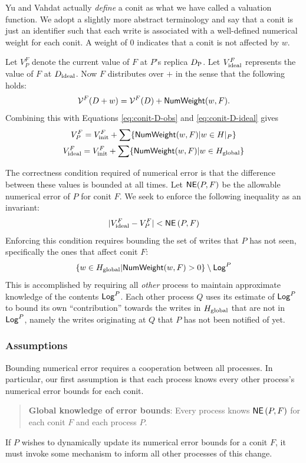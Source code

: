 \documentclass[]             %
{NASA}                       %
\theoremstyle{definition}
\begin{document}
Yu and Vahdat actually \emph{define} a conit as what we have called a
valuation function. We adopt a slightly more abstract terminology and
say that a conit is just an identifier such that each write is
associated with a well-defined numerical weight for each conit. A
weight of $0$ indicates that a conit is not affected by $w$.

Let $V^F_P$ denote the current value of $F$ at $P$'s replica $D_{\textrm{P}}$. Let
$V^{F}_{\textrm{ideal}}$ represents the value of $F$ at $D_{\textrm{ideal}}$.  Now $F$
distributes over $+$ in the sense that the following holds:
\begin{equation}
  \mathcal{V}^F(D + w) = \mathcal{V}^F(D) + \mathsf{NumWeight}(w, F).
\end{equation}
Combining this with Equations \eqref{eq:conit-D-obs} and
\eqref{eq:conit-D-ideal} gives
\begin{gather}
  V^{F}_{P} = V^{F}_{\textrm{init}} + \sum \{\mathsf{NumWeight}(w, F) | w \in H|_{P}\} \\
  V^{F}_{\textrm{ideal}} = V^{F}_{\textrm{init}} + \sum \{\mathsf{NumWeight}(w, F) | w \in H_\mathrm{global}\}
\end{gather}

The correctness condition required of numerical error is that the
difference between these values is bounded at all times. Let
$\mathsf{NE}(P, F)$ be the allowable numerical error of $P$ for conit $F$. We
seek to enforce the following inequality as an invariant:
\begin{equation}
  | V^{F}_{\textrm{ideal}} - V^{F}_{P} | < \mathsf{NE}\left(P, F \right)
\end{equation}
Enforcing this condition requires bounding the set of writes that $P$
has not seen, specifically the ones that affect conit $F$:
\[
  \{ w \in H_\mathrm{global} | \mathsf{NumWeight}(w, F) > 0 \} \setminus \mathsf{Log}^{P}
\]
This is accomplished by requiring all \emph{other} process to maintain
approximate knowledge of the contents $\mathsf{Log}^{P}$. Each other process $Q$
uses its estimate of $\mathsf{Log}^{P}$ to bound its own ``contribution''
towards the writes in $H_\mathrm{global}$ that are not in $\mathsf{Log}^{P}$, namely the
writes originating at $Q$ that $P$ has not been notified of yet.

\subsubsection{Assumptions}
\label{sssec:conit-numerical-assumptions}

Bounding numerical error requires a cooperation between all
processes. In particular, our first assumption is that each process
knows every other process's numerical error bounds for each conit.
\begin{quote}
  \textbf{Global knowledge of error bounds}: Every process knows
  $\mathsf{NE}\left(P, F \right)$ for each conit $F$ and each process $P$.
\end{quote}
If $P$ wishes to dynamically update its numerical error bounds for a
conit $F$, it must invoke some mechanism to inform all other processes
of this change.
\end{document}

